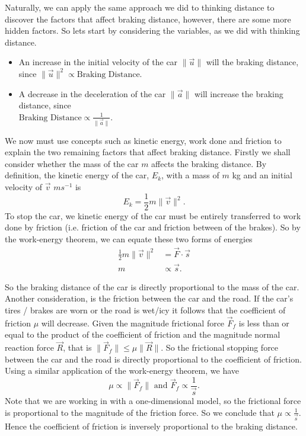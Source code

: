 Naturally, we can apply the same approach we did to thinking distance to discover the factors that affect braking distance, however, there are some more hidden factors. So lets start by considering the variables, as we did with thinking distance.
\begin{itemize}
    \item An increase in the initial velocity of the car $\| \vec{u} \|$ will the braking distance, since $\| \vec{u} \|^2 \propto \text{Braking Distance}$. 
    \item A decrease in the deceleration of the car $\| \vec{a} \|$ will increase the braking distance, since \\$\text{Braking Distance} \propto \frac{1}{\| \vec{a} \|}$.
\end{itemize}
We now must use concepts such as kinetic energy, work done and friction to explain the two remaining factors that affect braking distance. Firstly we shall consider whether the mass of the car $m$ affects the braking distance. By definition, the kinetic energy of the car, $E_k$, with a mass of $m$ kg and an initial velocity of $\vec{v}$ $ms^{-1}$ is 
\begin{equation*}
    E_k = \frac{1}{2} m \| \vec{v} \|^2.
\end{equation*}
To stop the car, we kinetic energy of the car must be entirely transferred to work done by friction (i.e. friction of the car and friction between of the brakes). So by the work-energy theorem, we can equate these two forms of energies
\begin{align*}
    \frac{1}{2} m \| \vec{v} \|^2 &= \vec{F} \cdot \vec{s} \\
    m &\propto \vec{s}.
\end{align*}

So the braking distance of the car is directly proportional to the mass of the car. Another consideration, is the friction between the car and the road. If the car's tires / brakes are worn or the road is wet/icy it follows that the coefficient of friction $\mu$ will decrease. Given the magnitude frictional force $\vec{F}_f$ is less than or equal to the product of the coefficient of friction and the magnitude normal reaction force $\vec{R}$, that is $\| \vec{F}_f \| \leq \mu \| \vec{R} \|$. So the frictional stopping force between the car and the road is directly proportional to the coefficient of friction. Using a similar application of the work-energy theorem, we have
\begin{equation*}
    \mu \propto \| \vec{F}_f \| \text{ and }  \vec{F}_f  \propto \frac{1}{\vec{s}}.
\end{equation*}
Note that we are working in with a one-dimensional model, so the frictional force is proportional to the magnitude of the friction force. So we conclude that $\mu \propto \frac{1}{\vec{s}}$. Hence the coefficient of friction is inversely proportional to the braking distance. 